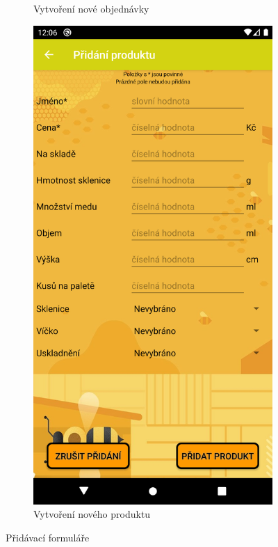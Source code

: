 \documentclass[12pt]{report}
\begin{document}
\begin{figure}[H]
\begin{subfigure}{.45\textwidth}
	  \caption{Vytvoření nové objednávky}
	  \label{fig:order_add}
	\end{subfigure}
	\begin{subfigure}{.45\textwidth}
	  \centering
	  \includegraphics[width=\textwidth]{img/product_addition.png}
	  \caption{Vytvoření nového produktu}
	  \label{fig:product_add}
	\end{subfigure}
	\caption{Přidávací formuláře}
	\label{fig:creation_cont}
\end{figure}
\end{document}
